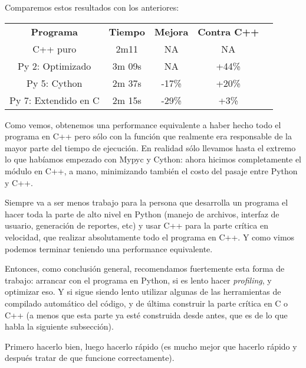 
Comparemos estos resultados con los anteriores:

\begin{center}
 \begin{tabular} {ccccc} 
 \toprule
  \textbf{Programa} & \textbf{Tiempo} & \textbf{Mejora} & \textbf{Contra C++} \\ 
  C++ puro & 2m11 & NA & NA \\
  Py 2: Optimizado & 3m 09s & NA & +44\% \\
  Py 5: Cython & 2m 37s & -17\% & +20\% \\
  Py 7: Extendido en C & 2m 15s & -29\% & +3\% \\
  \bottomrule
 \end{tabular}
\end{center}

Como vemos, obtenemos una performance equivalente a haber hecho todo el programa en C++ pero sólo con la función que realmente era responsable de la mayor parte del tiempo de ejecución. En realidad sólo llevamos hasta el extremo lo que habíamos empezado con Mypyc y Cython: ahora hicimos completamente el módulo en C++, a mano, minimizando también el costo del pasaje entre Python y C++.

Siempre va a ser menos trabajo para la persona que desarrolla un programa el hacer toda la parte de alto nivel en Python (manejo de archivos, interfaz de usuario, generación de reportes, etc) y usar C++ para la parte crítica en velocidad, que realizar absolutamente todo el programa en C++. Y como vimos podemos terminar teniendo una performance equivalente.

Entonces, como conclusión general, recomendamos fuertemente esta forma de trabajo: arrancar con el programa en Python, si es lento hacer \textit{profiling}, y optimizar eso. Y si sigue siendo lento utilizar algunas de las herramientas de compilado automático del código, y de última construir la parte crítica en C o C++ (a menos que esta parte ya esté construida desde antes, que es de lo que habla la siguiente subsección).

Primero hacerlo bien, luego hacerlo rápido (es mucho mejor que hacerlo rápido y después tratar de que funcione correctamente).

